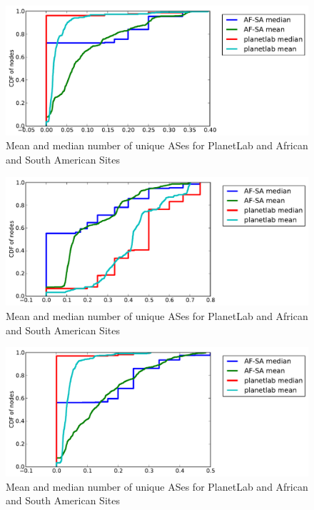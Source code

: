 \documentclass{sig-alternate-10pt}
\begin{document}
\begin{figure}
\centering
    \includegraphics[width=1.0\linewidth]{figs/fractions_of_types-ltp.pdf}
    \caption{Mean and median number of unique ASes for PlanetLab and African
and South American Sites}
\end{figure}

\begin{figure}
\centering
    \includegraphics[width=1.0\linewidth]{figs/fractions_of_types-stp.pdf}
    \caption{Mean and median number of unique ASes for PlanetLab and African
and South American Sites}
\end{figure}

\begin{figure}
\centering
    \includegraphics[width=1.0\linewidth]{figs/fractions_of_types-tier1.pdf}
    \caption{Mean and median number of unique ASes for PlanetLab and African
and South American Sites}
\end{figure}
\end{document}
